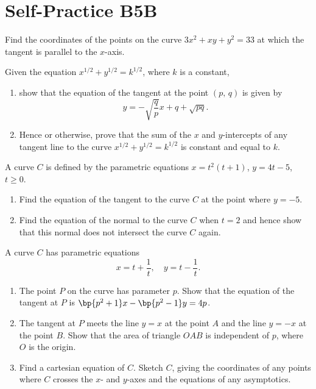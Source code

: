 \section{Self-Practice B5B}

\begin{problem}
    Find the coordinates of the points on the curve $3x^{2}+xy+y^{2}=33$ at which the tangent is parallel to the $x$-axis.
\end{problem}

\begin{problem}
    Given the equation $x^{1/2}+y^{1/2}=k^{1/2}$, where $k$ is a constant,
    \begin{enumerate}
        \item show that the equation of the tangent at the point $(p,\,q)$ is given by \[y = -\sqrt{\frac{q}{p}} x + q + \sqrt{pq}.\]
        \item Hence or otherwise, prove that the sum of the $x$ and $y$-intercepts of any tangent line to the curve $x^{1/2}+y^{1/2}=k^{1/2}$ is constant and equal to $k$.
    \end{enumerate}
\end{problem}

\begin{problem}
    A curve $C$ is defined by the parametric equations $x=t^{2}(t+1)$, $y=4t-5$, $t\geq0$.

    \begin{enumerate}
        \item Find the equation of the tangent to the curve $C$ at the point where $y=-5$.
        \item Find the equation of the normal to the curve $C$ when $t=2$ and hence show that this normal does not intersect the curve $C$ again.
    \end{enumerate}
\end{problem}

\begin{problem}
    A curve $C$ has parametric equations \[x = t + \frac1t, \quad y = t - \frac1t.\]

    \begin{enumerate}
        \item The point $P$ on the curve has parameter $p$. Show that the equation of the tangent at $P$ is $\bp{p^2 + 1} x - \bp{p^2 - 1} y = 4p$.
        \item The tangent at $P$ meets the line $y=x$ at the point $A$ and the line $y=-x$ at the point $B$. Show that the area of triangle $OAB$ is independent of $p$, where $O$ is the origin.
        \item Find a cartesian equation of $C$. Sketch $C$, giving the coordinates of any points where $C$ crosses the $x$- and $y$-axes and the equations of any asymptotics.
    \end{enumerate}
\end{problem}

